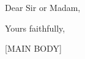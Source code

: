 

\usepackage{ragged2e}
\usepackage[yyyymmdd]{datetime}
\renewcommand{\dateseparator}{ }
\usepackage[a4paper, top=1cm, bottom=1cm, left=1cm, right=1cm]{geometry}


  
\date{\today}
\opening{Dear Sir or Madam,}
\closing{Yours faithfully,\vspace{-2em}}
\makelettertitle
\justifying

[MAIN BODY]

\vspace{1em}
\makeletterclosing


